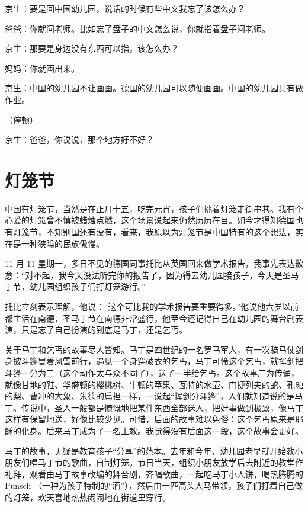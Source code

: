 \documentclass[twoside,openright,headings=optiontohead]{ctexbook} %
\begin{document}
{京生：要是回中国幼儿园，说话的时候有些中文我忘了该怎么办？

爸爸：你就问老师。比如忘了盘子的中文怎么说，你就指着盘子问老师。

京生：那要是身边没有东西可以指，该怎么办？

妈妈：你就画出来。

京生：中国的幼儿园不让画画。德国的幼儿园可以随便画画。中国的幼儿园只有做作业。

（停顿）

京生：爸爸，你说说，那个地方好不好？

\chapter*{灯笼节}\label{lamp-fest}

中国有灯笼节，当然是在正月十五，吃完元宵，孩子们挑着灯笼走街串巷。我有个心爱的灯笼曾不慎被蜡烛点燃，这个场景说起来仍然历历在目。如今才得知德国也有灯笼节，不知别国还有没有，看来，我原以为灯笼节是中国特有的这个想法，实在是一种狭隘的民族傲慢。

11 月 11
星期一，多日不见的德国同事托比从英国回来做学术报告，我事先表达歉意：``对不起，我今天没法听完你的报告了，因为得去幼儿园接孩子，今天是圣马丁节，幼儿园组织孩子们打灯笼游行。''

托比立刻表示理解，他说：``这个可比我的学术报告要重要得多。''他说他六岁以前都生活在南德，圣马丁节在南德非常盛行，他至今还记得自己在幼儿园的舞台剧表演，只是忘了自己扮演的到底是马丁，还是乞丐。

关于马丁和乞丐的故事尽人皆知。马丁是四世纪的一名罗马军人，有一次骑马仗剑身披斗篷冒着风雪前行，遇见一个身穿破衣的乞丐，马丁可怜这个乞丐，就挥剑把斗篷一分为二（这个动作太与众不同了），送了一半给乞丐。这个故事广为传诵，就像甘地的鞋、华盛顿的樱桃树、牛顿的苹果、瓦特的水壶、门捷列夫的蛇、孔融的梨、曹冲的大象、朱德的扁担一样，一说起``挥剑分斗篷''，人们就知道说的是马丁。传说中，圣人一般都是慷慨地把某件东西全部送人，把好事做到极致，像马丁这样有保留地送，好像比较少见。可惜，后面的故事难以免俗：这个乞丐原来是耶稣的化身。后来马丁成为了一名主教。我觉得没有后面这一段，这个故事会更好。

马丁的故事，无疑是教育孩子``分享''的范本。去年和今年，幼儿园老早就开始教小朋友们唱马丁节的歌曲，自制灯笼。节日当天，组织小朋友放学后去附近的教堂作礼拜，观看由马丁故事改编的舞台剧，齐唱歌曲，一起吃马丁小人饼，喝热腾腾的
Punsch
（一种为孩子特制的``酒''），然后由一匹高头大马带领，孩子们打着自己做的灯笼，欢天喜地热热闹闹地在街道里穿行。

}
\end{document}
